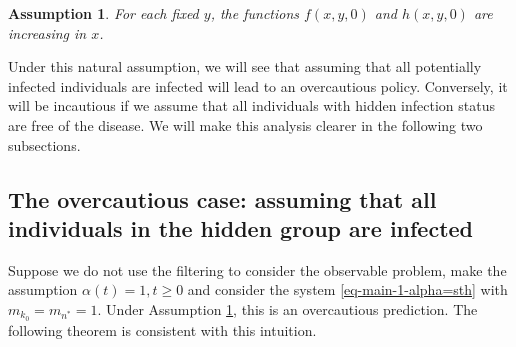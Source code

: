 \documentclass[12pt]{amsart}
\newtheorem {asp}{Assumption}[section]
\theoremstyle{remark}
\numberwithin{equation}{section}
\numberwithin{equation}{section}
\newcommand{\1}{\boldsymbol{1}}
\def\hat{\widehat}
\begin{document}
\begin{asp}\label{asp-natural}
	For each fixed $y$, the functions $f(x,y,0)$ and $h(x,y,0)$ are increasing in $x$.
\end{asp}

Under this natural assumption, we will see that assuming that all potentially infected individuals are infected will lead to an overcautious policy. Conversely, it will be incautious if we assume that all individuals with hidden infection status are free of the disease.
We will make this analysis clearer in the following two subsections.

\subsection{The overcautious case: assuming that all individuals in the hidden group are infected}
Suppose we do not use the filtering to consider the observable problem, make the assumption $\alpha(t)=1, t\geq 0$ and consider the system \eqref{eq-main-1-alpha=sth} with $m_{k_0}=m_{n^*}=1$.
Under Assumption \ref{asp-natural}, this is an overcautious prediction.
The following theorem is consistent with this intuition.
%
\end{document}
